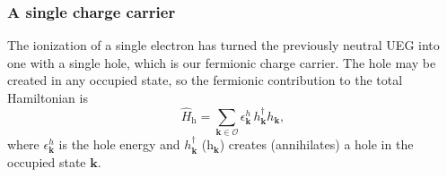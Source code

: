 \subsubsection{A single charge carrier}
The ionization of a single electron has turned the previously neutral UEG into one with a single hole, which is our fermionic charge carrier. The hole may be created in any occupied state, so the fermionic contribution to the total Hamiltonian is \begin{equation}
    \hat{H}_{\mathrm{h}} = \sum_{\bm{k}\in\mathcal{O}}
\epsilon_{\bm{k}}^{h}\,
h_{\bm{k}}^\dagger h_{\bm{k}},
\end{equation}
where $\epsilon_{\bm{k}}^{h}$ is the hole energy and $h_{\bm{k}}^\dagger$ (h$_{\bm{k}}$) creates (annihilates) a hole in the occupied state $\bm{k}$.
